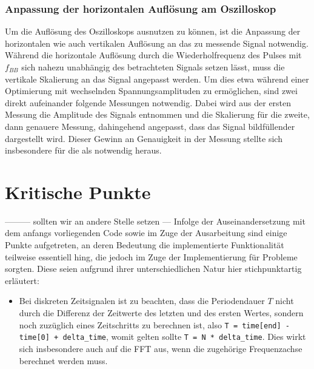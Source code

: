 \documentclass[../Report.tex]{subfiles}
\begin{document}
\subsubsection{Anpassung der horizontalen Auflösung am Oszilloskop}

Um die Auflösung des Oszilloskops ausnutzen zu können, ist die Anpassung der horizontalen wie auch vertikalen Auflösung an das zu messende Signal notwendig.
Während die horizontale Auflösung durch die Wiederholfrequenz des Pulses mit $f_{BB}$ sich nahezu unabhängig des betrachteten Signals setzen lässt, muss die vertikale Skalierung an das Signal angepasst werden. Um dies etwa während einer Optimierung mit wechselnden Spannungsamplituden zu ermöglichen, sind zwei direkt aufeinander folgende Messungen notwendig. Dabei wird aus der ersten Messung die Amplitude des Signals entnommen und die Skalierung für die zweite, dann genauere Messung, dahingehend angepasst, dass das Signal bildfüllender dargestellt wird.
Dieser Gewinn an Genauigkeit in der Messung stellte sich insbesondere für die  als notwendig heraus.


\section{Kritische Punkte}
\label{sec:vorg.critical}
--------- sollten wir an andere Stelle setzen ---
Infolge der Auseinandersetzung mit dem anfangs vorliegenden Code sowie im Zuge der Ausarbeitung sind einige Punkte aufgetreten, an deren Bedeutung die implementierte Funktionalität teilweise essentiell hing, die jedoch im Zuge der Implementierung für Probleme sorgten. Diese seien aufgrund ihrer unterschiedlichen Natur hier stichpunktartig erläutert:
\begin{itemize}
	\item	Bei diskreten Zeitsignalen ist zu beachten, dass die Periodendauer $T$ nicht durch die Differenz der Zeitwerte des letzten und des ersten Wertes, sondern noch zuzüglich eines Zeitschritts  zu berechnen ist, also \lstinline{T = time[end] - time[0] + delta_time}, womit gelten sollte \lstinline{T = N * delta_time}. Dies wirkt sich insbesondere auch auf die FFT aus, wenn die zugehörige Frequenzachse berechnet werden muss.
\end{itemize}
\end{document}
